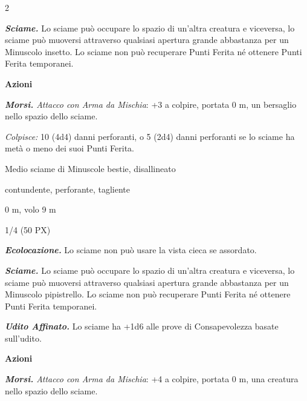 \begin{multicols}{2}
{\emph{\textbf{Sciame.}} Lo sciame può occupare lo spazio di un'altra creatura e viceversa, lo sciame può muoversi attraverso qualsiasi apertura grande abbastanza per un Minuscolo insetto. Lo sciame non può recuperare Punti Ferita né ottenere Punti Ferita temporanei.

\textbf{Azioni}

\emph{\textbf{Morsi.} Attacco con Arma da Mischia}: +3 a colpire, portata 0 m, un bersaglio nello spazio dello sciame.

\emph{Colpisce:} 10 (4d4) danni perforanti, o 5 (2d4) danni perforanti se lo sciame ha metà o meno dei suoi Punti Ferita.

\begin{description}[noitemsep, topsep=0pt, parsep=0pt, partopsep=0pt, itemsep=1pt, leftmargin=2.35cm,  labelwidth=2.2cm, itemindent=0cm, listparindent=0pt] %
\setlength{\baselineskip}{10pt}
\item[\textbf{Taglia/Tipo}] Medio sciame di Minuscole bestie, disallineato
\item[\textbf{Caratt.}] 
\item[\textbf{Punti Ferita}] 
\item[\textbf{Resistenze al danno}] contundente, perforante, tagliente
\item[\textbf{Tiri Salvez.}] 
\item[\textbf{Movimento}] 0 m, volo 9 m
\item[\textbf{Sfida}] 1/4 (50 PX)
\end{description}
\smallskip

\emph{\textbf{Ecolocazione.}} Lo sciame non può usare la vista cieca se assordato.

\emph{\textbf{Sciame.}} Lo sciame può occupare lo spazio di un'altra creatura e viceversa, lo sciame può muoversi attraverso qualsiasi apertura grande abbastanza per un Minuscolo pipistrello. Lo sciame non può recuperare Punti Ferita né ottenere Punti Ferita temporanei.

\emph{\textbf{Udito Affinato.}} Lo sciame ha +1d6 alle prove di Consapevolezza basate sull'udito.

\textbf{Azioni}

\emph{\textbf{Morsi.} Attacco con Arma da Mischia}: +4 a colpire, portata 0 m, una creatura nello spazio dello sciame.

}
\end{multicols}
